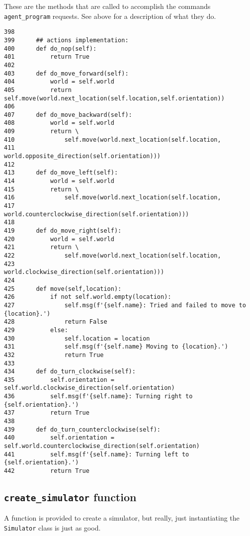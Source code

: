 \documentclass[11pt]{tufte-handout}
\begin{document}
These are the methods that are called to accomplish the commands \texttt{agent\_program} requests.  See above for a description of what they do.

\begin{verbatim}
398  
399      ## actions implementation:
400      def do_nop(self):
401          return True
402  
403      def do_move_forward(self):
404          world = self.world
405          return self.move(world.next_location(self.location,self.orientation))
406  
407      def do_move_backward(self):
408          world = self.world
409          return \
410              self.move(world.next_location(self.location,
411                                            world.opposite_direction(self.orientation)))
412  
413      def do_move_left(self):
414          world = self.world
415          return \
416              self.move(world.next_location(self.location,
417                                            world.counterclockwise_direction(self.orientation)))
418  
419      def do_move_right(self):
420          world = self.world
421          return \
422              self.move(world.next_location(self.location,
423                                            world.clockwise_direction(self.orientation)))
424  
425      def move(self,location):
426          if not self.world.empty(location):
427              self.msg(f'{self.name}: Tried and failed to move to {location}.')
428              return False
429          else:
430              self.location = location
431              self.msg(f'{self.name} Moving to {location}.')
432              return True
433  
434      def do_turn_clockwise(self):
435          self.orientation = self.world.clockwise_direction(self.orientation)
436          self.msg(f'{self.name}: Turning right to {self.orientation}.')
437          return True
438  
439      def do_turn_counterclockwise(self):
440          self.orientation = self.world.counterclockwise_direction(self.orientation)
441          self.msg(f'{self.name}: Turning left to {self.orientation}.')
442          return True
\end{verbatim}

\subsection{\texttt{create\_simulator} function}
\label{sec:org1da078e}

A function is provided to create a simulator, but really, just instantiating the \texttt{Simulator} class is just as good.
\end{document}
